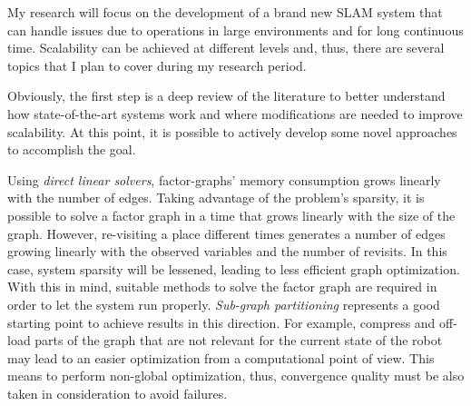 \documentclass[10pt,a4paper, notitlepage]{report}
\begin{document}
My research will focus on the development of a brand new SLAM system that can handle issues due to operations in large environments and for long continuous time. Scalability can be achieved at different levels and, thus, there are several topics that I plan to cover during my research period.

Obviously, the first step is a deep review of the literature to better understand how state-of-the-art systems work and where modifications are needed to improve scalability. At this point, it is possible to actively develop some novel approaches to accomplish the goal.

Using \textit{direct linear solvers}, factor-graphs' memory consumption grows linearly with the number of edges. Taking advantage of the problem's sparsity, it is possible to solve a factor graph in a time that grows linearly with the size of the graph. However, re-visiting a place different times generates a number of edges growing linearly with the observed variables and the number of revisits. In this case, system sparsity will be lessened, leading to less efficient graph optimization. With this in mind, suitable methods to solve the factor graph are required in order to let the system run properly. \textit{Sub-graph partitioning} \cite{grisetti2012condensed-m} represents a good starting point to achieve results in this direction. For example, compress and off-load parts of the graph that are not relevant for the current state of the robot may lead to an easier optimization from a computational point of view. This means to perform non-global optimization, thus, convergence quality must be also taken in consideration to avoid failures.
\end{document}
